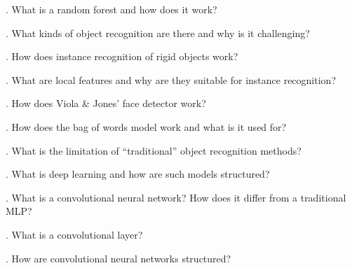 \documentclass[paper=A4,11pt]{scrartcl}
\begin{document}
\bigskip{}. What is a random forest and how does it work?

\bigskip{}. What kinds of object recognition are there and why is it challenging?

\bigskip{}. How does instance recognition of rigid objects work?

\bigskip{}. What are local features and why are they suitable for instance recognition?

\bigskip{}. How does Viola \& Jones' face detector work?

\bigskip{}. How does the bag of words model work and what is it used for?

\bigskip{}. What is the limitation of \enquote{traditional} object recognition methods?

\bigskip{}. What is deep learning and how are such models structured?

\bigskip{}. What is a convolutional neural network? How does it differ from a traditional MLP?

\bigskip{}. What is a convolutional layer?

\bigskip{}. How are convolutional neural networks structured?

\bigskip\noindent

\printbibliography
\end{document}
